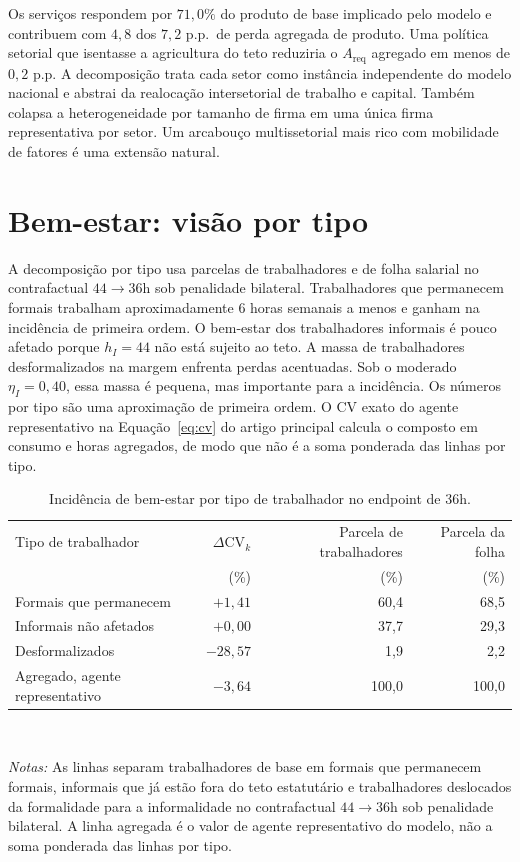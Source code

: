 \documentclass[12pt,a4paper]{article}
\begin{document}
Os servi\c{c}os respondem por $71{,}0\%$ do produto de base implicado pelo modelo e contribuem com $4{,}8$ dos $7{,}2$ p.p.\ de perda agregada de produto. Uma pol\'itica setorial que isentasse a agricultura do teto reduziria o $A_{\text{req}}$ agregado em menos de $0{,}2$ p.p. A decomposi\c{c}\~ao trata cada setor como inst\^ancia independente do modelo nacional e abstrai da realoca\c{c}\~ao intersetorial de trabalho e capital. Tamb\'em colapsa a heterogeneidade por tamanho de firma em uma \'unica firma representativa por setor. Um arcabou\c{c}o multissetorial mais rico com mobilidade de fatores \'e uma extens\~ao natural.

\clearpage
\section{Bem-estar: vis\~ao por tipo}\label{app:welfare_additional}

A decomposi\c{c}\~ao por tipo usa parcelas de trabalhadores e de folha salarial no contrafactual $44\to 36$h sob penalidade bilateral. Trabalhadores que permanecem formais trabalham aproximadamente 6 horas semanais a menos e ganham na incid\^encia de primeira ordem. O bem-estar dos trabalhadores informais \'e pouco afetado porque $h_I=44$ n\~ao est\'a sujeito ao teto. A massa de trabalhadores desformalizados na margem enfrenta perdas acentuadas. Sob o moderado $\eta_I=0{,}40$, essa massa \'e pequena, mas importante para a incid\^encia. Os n\'umeros por tipo s\~ao uma aproxima\c{c}\~ao de primeira ordem. O CV exato do agente representativo na Equa\c{c}\~ao~\eqref{eq:cv} do artigo principal calcula o composto em consumo e horas agregados, de modo que n\~ao \'e a soma ponderada das linhas por tipo.

\begin{table}[htbp]
\centering
\caption{Incid\^encia de bem-estar por tipo de trabalhador no endpoint de 36h.}\label{tab:welfare_incidence_by_type}
\small
\begin{tabular}{lrrr}
\hline\hline
Tipo de trabalhador & $\Delta$CV$_k$ & Parcela de trabalhadores & Parcela da folha \\
 & (\%) & (\%) & (\%) \\
\hline
Formais que permanecem & $+1{,}41$ & 60{,}4 & 68{,}5 \\
Informais n\~ao afetados & $+0{,}00$ & 37{,}7 & 29{,}3 \\
Desformalizados & $-28{,}57$ & 1{,}9 & 2{,}2 \\
\hline
Agregado, agente representativo & $-3{,}64$ & 100{,}0 & 100{,}0 \\
\hline\hline
\end{tabular}
\\[2pt]
\begin{minipage}{0.90\textwidth}
\justifying
{\footnotesize \textit{Notas:} As linhas separam trabalhadores de base em formais que permanecem formais, informais que j\'a est\~ao fora do teto estatut\'ario e trabalhadores deslocados da formalidade para a informalidade no contrafactual $44\to36$h sob penalidade bilateral. A linha agregada \'e o valor de agente representativo do modelo, n\~ao a soma ponderada das linhas por tipo.}
\end{minipage}
\end{table}
\end{document}
